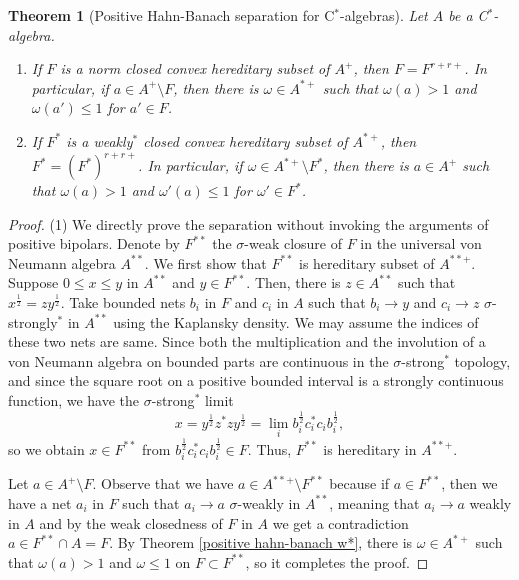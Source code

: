 \documentclass[a4paper]{amsart}
\theoremstyle{plain}
\newtheorem{thm}{Theorem}[section]
\theoremstyle{definition}
\begin{document}
\begin{thm}[Positive Hahn-Banach separation for C$^*$-algebras]
Let $A$ be a C$^*$-algebra.
\begin{enumerate}
\item If $F$ is a norm closed convex hereditary subset of $A^+$, then $F=F^{r+r+}$. In particular, if $a\in A^+\setminus F$, then there is $\omega\in A^{*+}$ such that $\omega(a)>1$ and $\omega(a')\le1$ for $a'\in F$.
\item If $F^*$ is a weakly$^*$ closed convex hereditary subset of $A^{*+}$, then $F^*=(F^*)^{r+r+}$. In particular, if $\omega\in A^{*+}\setminus F^*$, then there is $a\in A^+$ such that $\omega(a)>1$ and $\omega'(a)\le1$ for $\omega'\in F^*$.
\end{enumerate}
\end{thm}
\begin{proof}
(1)
We directly prove the separation without invoking the arguments of positive bipolars.
Denote by $F^{**}$ the $\sigma$-weak closure of $F$ in the universal von Neumann algebra $A^{**}$.
We first show that $F^{**}$ is hereditary subset of $A^{**+}$.
Suppose $0\le x\le y$ in $A^{**}$ and $y\in F^{**}$.
Then, there is $z\in A^{**}$ such that $x^{\frac12}=zy^{\frac12}$.
Take bounded nets $b_i$ in $F$ and $c_i$ in $A$ such that $b_i\to y$ and $c_i\to z$ $\sigma$-strongly$^*$ in $A^{**}$ using the Kaplansky density.
We may assume the indices of these two nets are same.
Since both the multiplication and the involution of a von Neumann algebra on bounded parts are continuous in the $\sigma$-strong$^*$ topology, and since the square root on a positive bounded interval is a strongly continuous function, we have the $\sigma$-strong$^*$ limit
\[x=y^{\frac12}z^*zy^{\frac12}=\lim_ib_i^{\frac12}c_i^*c_ib_i^{\frac12},\]
so we obtain $x\in F^{**}$ from $b_i^{\frac12}c_i^*c_ib_i^{\frac12}\in F$.
Thus, $F^{**}$ is hereditary in $A^{**+}$.

Let $a\in A^+\setminus F$.
Observe that we have $a\in A^{**+}\setminus F^{**}$ because if $a\in F^{**}$, then we have a net $a_i$ in $F$ such that $a_i\to a$ $\sigma$-weakly in $A^{**}$, meaning that $a_i\to a$ weakly in $A$ and by the weak closedness of $F$ in $A$ we get a contradiction $a\in F^{**}\cap A=F$.
By Theorem \ref{positive hahn-banach w*}, there is $\omega\in A^{*+}$ such that $\omega(a)>1$ and $\omega\le1$ on $F\subset F^{**}$, so it completes the proof.


\end{proof}
\end{document}
